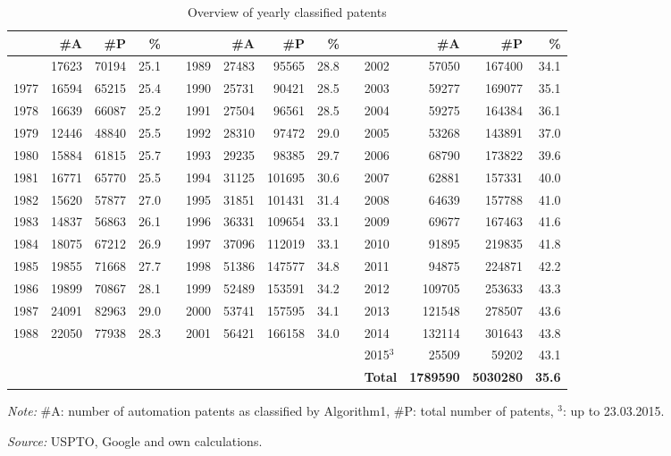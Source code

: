 \begin{table}[!htb]
\begin{small}
\begin{threeparttable}
\caption{{\normalsize Overview of yearly classified patents}}
\label{table:table_yearsstats}
\begin{tabular}{lrrrllrrrllrrr}
\toprule \addlinespace[0.5em]
 & \textbf{\#A} & \textbf{\#P} & \textbf{\%} & \phantom{aaa} & & \textbf{\#A} & \textbf{\#P} & \textbf{\%} & \phantom{aaa} & & \textbf{\#A} & \textbf{\#P} & \textbf{\%}\tabularnewline[0.1cm]
\midrule \addlinespace[0.5em]
1976 & 17623 & 70194 & 25.1 & & 1989 & 27483 & 95565 & 28.8 & & 2002 & 57050 & 167400 & 34.1 \tabularnewline[0.1cm]
1977 & 16594 & 65215 & 25.4 & & 1990 & 25731 & 90421 & 28.5 & & 2003 & 59277 & 169077 & 35.1 \tabularnewline[0.1cm]
1978 & 16639 & 66087 & 25.2 & & 1991 & 27504 & 96561 & 28.5 & & 2004 & 59275 & 164384 & 36.1 \tabularnewline[0.1cm]
1979 & 12446 & 48840 & 25.5 & & 1992 & 28310 & 97472 & 29.0 & & 2005 & 53268 & 143891 & 37.0 \tabularnewline[0.1cm]
1980 & 15884 & 61815 & 25.7 & & 1993 & 29235 & 98385 & 29.7 & & 2006 & 68790 & 173822 & 39.6 \tabularnewline[0.1cm]
1981 & 16771 & 65770 & 25.5 & & 1994 & 31125 & 101695 & 30.6 & & 2007 & 62881 & 157331 & 40.0 \tabularnewline[0.1cm]
1982 & 15620 & 57877 & 27.0 & & 1995 & 31851 & 101431 & 31.4 & & 2008 & 64639 & 157788 & 41.0 \tabularnewline[0.1cm]
1983 & 14837 & 56863 & 26.1 & & 1996 & 36331 & 109654 & 33.1 & & 2009 & 69677 & 167463 & 41.6 \tabularnewline[0.1cm]
1984 & 18075 & 67212 & 26.9 & & 1997 & 37096 & 112019 & 33.1 & & 2010 & 91895 & 219835 & 41.8 \tabularnewline[0.1cm]
1985 & 19855 & 71668 & 27.7 & & 1998 & 51386 & 147577 & 34.8 & & 2011 & 94875 & 224871 & 42.2 \tabularnewline[0.1cm]
1986 & 19899 & 70867 & 28.1 & & 1999 & 52489 & 153591 & 34.2 & & 2012 & 109705 & 253633 & 43.3 \tabularnewline[0.1cm]
1987 & 24091 & 82963 & 29.0 & & 2000 & 53741 & 157595 & 34.1 & & 2013 & 121548 & 278507 & 43.6 \tabularnewline[0.1cm]
1988 & 22050 & 77938 & 28.3 & & 2001 & 56421 & 166158 & 34.0 & & 2014 & 132114 & 301643 & 43.8 \tabularnewline[0.1cm]
& & & & & & & & & & 2015$^3$ & 25509 & 59202 & 43.1  \tabularnewline[0.1cm]
& & & & & & & & & & \textbf{Total} & \textbf{1789590} & \textbf{5030280} & \textbf{35.6} \tabularnewline[0.1cm]
\bottomrule\end{tabular}
\begin{tablenotes}
\small
\item\textit{Note:} \#A: number of automation patents as classified by Algorithm1, \#P: total number of patents, $^3$: up to 23.03.2015.
\item\textit{Source:} USPTO, Google and own calculations.
\end{tablenotes}
\end{threeparttable}
\end{small}
\end{table}
